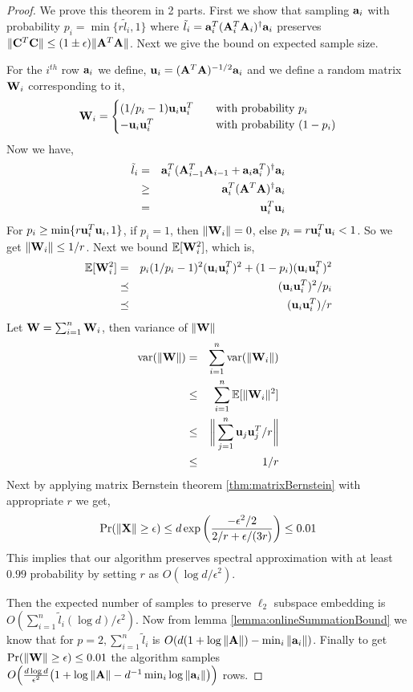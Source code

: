 \begin{proof}{\label{proof:improvedMatrixCoreset}}
We prove this theorem in 2 parts. First we show that sampling $\mathbf{a}_{i}$ with probability $p_{i}=\min\{r\tilde{l}_{i},1\}$ where $\tilde{l}_{i} = \mathbf{a}_{i}^{T}(\mathbf{A}_{i}^{T}\mathbf{A}_{i})^{\dagger}\mathbf{a}_{i}$ preserves $\|\mathbf{C}^{T}\mathbf{C}\| \leq (1\pm \epsilon)\|\mathbf{A}^{T}\mathbf{A}\|$. Next we give the bound on expected sample size.

For the $i^{th}$ row $\mathbf{a}_{i}$ we define, $\mathbf{u}_{i} = (\mathbf{A}^{T}\mathbf{A})^{-1/2}\mathbf{a}_{i}$ and we define a random matrix $\mathbf{W}_{i}$ corresponding to it, 
\[ \mathbf{W}_{i} =
  \begin{cases}
    (1/p_{i} - 1)\mathbf{u}_{i}\mathbf{u}_{i}^{T}  & \quad \text{with probability } p_{i}\\
    -\mathbf{u}_{i}\mathbf{u}_{i}^{T} & \quad \text{with probability } (1-p_{i})
  \end{cases}
\]
Now we have,
\begin{eqnarray*}
 \tilde{l}_{i} &=& \mathbf{a}_{i}^{T}(\mathbf{A}_{i-1}^{T}\mathbf{A}_{i-1}+\mathbf{a}_{i}\mathbf{a}_{i}^{T})^{\dagger}\mathbf{a}_{i} \\
 &\geq& \mathbf{a}_{i}^{T}(\mathbf{A}^{T}\mathbf{A})^{\dagger}\mathbf{a}_{i} \\
 &=& \mathbf{u}_{i}^{T}\mathbf{u}_{i}
\end{eqnarray*}
For $p_{i} \geq \min\{r\mathbf{u}_{i}^{T}\mathbf{u}_{i},1\}$, if $p_{i} = 1$, then $\|\mathbf{W}_{i}\| = 0$, else $p_{i} = r\mathbf{u}_{i}^{T}\mathbf{u}_{i} < 1$. So we get $\left\lVert\mathbf{W}_{i}\right\rVert \leq 1/r$. 
Next we bound $\mathbb{E}[\mathbf{W}_{i}^{2}]$, which is,
\begin{eqnarray*}
 \mathbb{E}[\mathbf{W}_{i}^{2}] &=& p_{i}(1/p_{i}-1)^{2}(\mathbf{u}_{i}\mathbf{u}_{i}^{T})^{2}+(1-p_{i})(\mathbf{u}_{i}\mathbf{u}_{i}^{T})^{2} \\
 &\preceq& (\mathbf{u}_{i}\mathbf{u}_{i}^{T})^{2}/p_{i} \\
 &\preceq& (\mathbf{u}_{i}\mathbf{u}_{i}^{T})/r
\end{eqnarray*}
Let $\mathbf{W} = \sum_{i=1}^{n} \mathbf{W}_{i}$, then variance of $\|\mathbf{W}\|$ 
\begin{eqnarray*}
\mbox{var}(\left\lVert\mathbf{W}\right\rVert) &=& \sum_{i=1}^{n}\mbox{var}(\|\mathbf{W}_{i}\|) \\
&\leq& \sum_{i=1}^{n} \mathbb{E}[\|\mathbf{W}_{i}\|^{2}] \\ 
&\leq& \bigg\lVert\sum_{j=1}^{n} \mathbf{u}_{j}\mathbf{u}_{j}^{T}/r \bigg\rVert \\
&\leq& 1/r
\end{eqnarray*}
Next by applying matrix Bernstein theorem \ref{thm:matrixBernstein} with appropriate $r$ we get,
\begin{equation*}
 \mbox{Pr}(\left\lVert\mathbf{X}\right\rVert\geq\epsilon) \leq d \exp\bigg(\frac{-\epsilon^{2}/2}{2/r+\epsilon/(3r)}\bigg)\leq 0.01
\end{equation*}
This implies that our algorithm preserves spectral approximation with at least $0.99$ probability by setting $r$ as $O(\log d/\epsilon^{2})$.

Then the expected number of samples to preserve $\ell_{2}$ subspace embedding is $O(\sum_{i=1}^{n}\tilde{l}_{i}(\log d)/\epsilon^{2})$. Now from lemma \ref{lemma:onlineSummationBound} we know that for $p=2, \sum_{i=1}^{n}\tilde{l}_{i}$ is $O(d(1+\log \|\mathbf{A}\|) - \min_{i} \|\mathbf{a}_{i}\|)$. Finally to get $\mbox{Pr}(\left\lVert\mathbf{W}\right\rVert\geq\epsilon) \leq 0.01$ the algorithm samples $O\Big(\frac{d\log d}{\epsilon^{2}}\big(1+\log\|\mathbf{A}\| - d^{-1}\min_{i}\log \|\mathbf{a}_{i}\|\big)\Big)$ rows.
\end{proof}